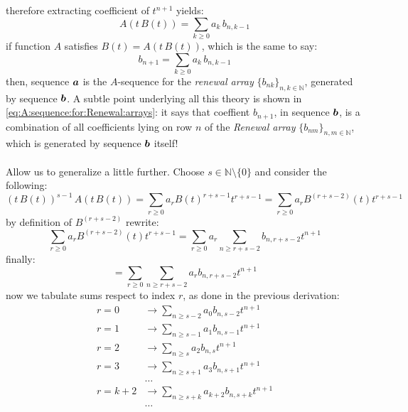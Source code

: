 therefore extracting coefficient of $t^{n+1}$ yields:
\begin{displaymath}
    [t^{n+1}]A(t\,B(t))=\sum_{k\geq 0}{a_{k}\,b_{n,k-1}}
\end{displaymath}
if function $A$ satisfies 
$B(t)=A(t\,B(t))$, which is the same to say:
\begin{equation}
    b_{n+1}=\sum_{k\geq 0}{a_{k}\,b_{n,k-1}}
    \label{eq:A:sequence:for:Renewal:arrays}
\end{equation}
then, sequence $\boldsymbol{a}$ is the $A$-sequence for the \emph{renewal array}
$\lbrace b_{nk}\rbrace_{n,k\in\mathbb{N}}$, generated by sequence $\boldsymbol{b}$.
A subtle point underlying all this theory is shown in 
\autoref{eq:A:sequence:for:Renewal:arrays}: it says that coeffient
$b_{n+1}$, in sequence $\boldsymbol{b}$, is a combination
of all coefficients lying on row $n$ of the \emph{Renewal array}
$\lbrace b_{nm}\rbrace_{n,m\in\mathbb{N}}$,
which is generated by sequence $\boldsymbol{b}$ itself!
\\\\
Allow us to generalize a little further. Choose 
$s\in\mathbb{N}\setminus\lbrace0\rbrace$ and consider the following:
\begin{displaymath}
    (t\,B(t))^{s-1}\,A\left(t\,B(t)\right) 
        = \sum_{r\geq 0}{a_{r}B(t)^{r+s-1}t^{r+s-1}}
        = \sum_{r\geq 0}{a_{r}B^{(r+s-2)}(t)t^{r+s-1}}
\end{displaymath}
by definition of $B^{(r+s-2)}$ rewrite:
\begin{displaymath}
    \sum_{r\geq 0}{a_{r}B^{(r+s-2)}(t)t^{r+s-1}}
        =\sum_{r\geq 0}{a_{r}\sum_{n\geq r+s-2}{b_{n,r+s-2}t^{n+1}}}
\end{displaymath}
finally:
\begin{displaymath}
    =\sum_{r\geq 0}{\sum_{n\geq r+s-2}{a_{r}b_{n,r+s-2}t^{n+1}}}
\end{displaymath}
now we tabulate sums respect to index $r$, as done in the previous derivation:
\begin{displaymath}
    \begin{split}
        r=0 &\rightarrow \sum_{n\geq s-2}{a_{0}b_{n,s-2}t^{n+1}}\\
        r=1 &\rightarrow \sum_{n\geq s-1}{a_{1}b_{n,s-1}t^{n+1}}\\
        r=2 &\rightarrow \sum_{n\geq s}{a_{2}b_{n,s}t^{n+1}}\\
        r=3 &\rightarrow \sum_{n\geq s+1}{a_{3}b_{n,s+1}t^{n+1}}\\
        &\ldots\\
        r=k+2 &\rightarrow \sum_{n\geq s+k}{a_{k+2}b_{n,s+k}t^{n+1}}\\
        &\ldots\\
    \end{split}
\end{displaymath}
